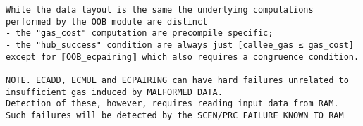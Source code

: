 \documentclass[varwidth=\maxdimen,margin=0.5cm,multi={verbatim}]{standalone}
\begin{document}
\begin{verbatim}
While the data layout is the same the underlying computations performed by the OOB module are distinct
- the "gas_cost" computation are precompile specific;
- the "hub_success" condition are always just [callee_gas ≤ gas_cost] except for ⟦OOB_ecpairing⟧ which also requires a congruence condition.

NOTE. ECADD, ECMUL and ECPAIRING can have hard failures unrelated to insufficient gas induced by MALFORMED DATA.
Detection of these, however, requires reading input data from RAM. Such failures will be detected by the SCEN/PRC_FAILURE_KNOWN_TO_RAM 
\end{verbatim}
\end{document}
